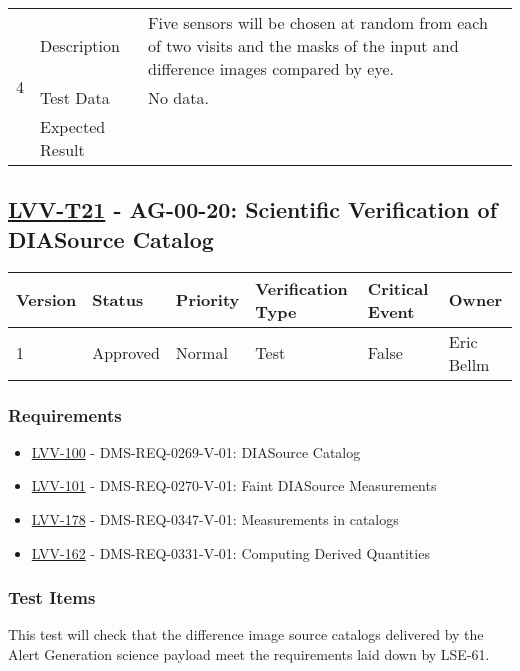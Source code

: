 \begin{longtable}[]{p{1.3cm}p{2cm}p{13cm}}
\multirow{3}{*}{ 4 } & Description &
\begin{minipage}[t]{13cm}{\footnotesize
Five sensors will be chosen at random from each of two visits and the
masks of the input and difference images compared by eye.

\vspace{\dp0}
} \end{minipage} \\ \cline{2-3}
& Test Data &
\begin{minipage}[t]{13cm}{\footnotesize
No data.
\vspace{\dp0}
} \end{minipage} \\ \cline{2-3}
& Expected Result &
\\ \midrule
\end{longtable}

\subsection{\href{https://jira.lsstcorp.org/secure/Tests.jspa\#/testCase/LVV-T21}{LVV-T21}
    - AG-00-20: Scientific Verification of DIASource Catalog}\label{lvv-t21}

\begin{longtable}[]{llllll}
\toprule
Version & Status & Priority & Verification Type & Critical Event & Owner
\\\midrule
1 & Approved & Normal &
Test & False & Eric Bellm
\\\bottomrule
\end{longtable}

\subsubsection{Requirements}
\begin{itemize}
\item \href{https://jira.lsstcorp.org/browse/LVV-100}{LVV-100} - DMS-REQ-0269-V-01: DIASource Catalog
\item \href{https://jira.lsstcorp.org/browse/LVV-101}{LVV-101} - DMS-REQ-0270-V-01: Faint DIASource Measurements
\item \href{https://jira.lsstcorp.org/browse/LVV-178}{LVV-178} - DMS-REQ-0347-V-01: Measurements in catalogs
\item \href{https://jira.lsstcorp.org/browse/LVV-162}{LVV-162} - DMS-REQ-0331-V-01: Computing Derived Quantities
\end{itemize}

\subsubsection{Test Items}
This test will check that the difference image source catalogs delivered
by the Alert Generation science payload meet the requirements laid down
by LSE-61.


